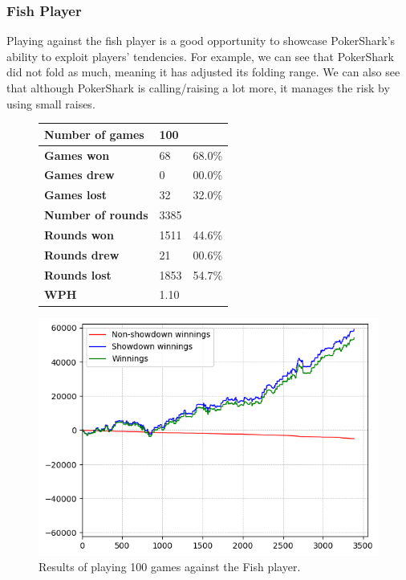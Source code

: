 \subsubsection{Fish Player}
Playing against the fish player is a good opportunity to showcase PokerShark's ability to exploit players' tendencies. For example, we can see that PokerShark did not fold as much, meaning it has adjusted its folding range. We can also see that although PokerShark is calling/raising a lot more, it manages the risk by using small raises.

\begin{figure}[H]
    \centering
    \begin{minipage}{\textwidth}
        \begin{minipage}{0.40\textwidth}
            \begin{tabular}{|l|l|l|}
                \hline
                \textbf{Number of games}  & 100  &        \\ \hline
                \textbf{Games won}        & 68   & 68.0\% \\ \hline
                \textbf{Games drew}       & 0    & 00.0\%  \\ \hline
                \textbf{Games lost}       & 32   & 32.0\% \\ \hline
                \textbf{Number of rounds} & 3385 &        \\ \hline
                \textbf{Rounds won}       & 1511 & 44.6\% \\ \hline
                \textbf{Rounds drew}      & 21   & 00.6\%  \\ \hline
                \textbf{Rounds lost}      & 1853 & 54.7\% \\ \hline
                \textbf{WPH}              & 1.10 &        \\ \hline
            \end{tabular}
        \end{minipage}
        \hspace{0.05\textwidth}
        \begin{minipage}{0.5\textwidth}
            \includegraphics[width=\textwidth]{graphics/fish.png}
        \end{minipage}
    \end{minipage}
    \caption{Results of playing 100 games against the Fish player.}
\end{figure}


